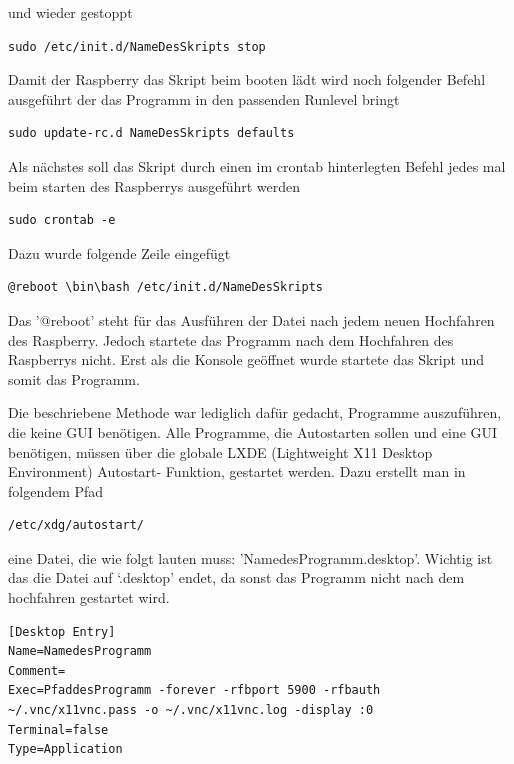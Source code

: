 \documentclass[11pt,a4paper]{article} %
\begin{document}
und wieder gestoppt
\begin{frame}

\begin{lstlisting}
sudo /etc/init.d/NameDesSkripts stop
\end{lstlisting}
\end{frame}

Damit der Raspberry das Skript beim booten lädt wird noch folgender Befehl ausgeführt der das Programm in den passenden Runlevel bringt
\begin{frame}

\begin{lstlisting}
sudo update-rc.d NameDesSkripts defaults
\end{lstlisting}
\end{frame}
\par

Als nächstes soll das Skript durch einen im crontab hinterlegten Befehl jedes mal beim starten des Raspberrys ausgeführt werden
\begin{frame}

\begin{lstlisting}
sudo crontab -e
\end{lstlisting}
\end{frame}
\newpage
Dazu wurde folgende Zeile eingefügt
\begin{frame}

\begin{lstlisting}
@reboot \bin\bash /etc/init.d/NameDesSkripts
\end{lstlisting}
\end{frame}
Das '@reboot' steht für das Ausführen der Datei nach jedem neuen Hochfahren des Raspberry. Jedoch startete das Programm nach dem Hochfahren des Raspberrys nicht. Erst als die Konsole geöffnet wurde startete das Skript und somit das Programm.
\par
Die beschriebene Methode war lediglich dafür gedacht, Programme auszuführen, die keine GUI benötigen. Alle Programme, die Autostarten sollen und eine GUI benötigen, müssen über die globale LXDE (Lightweight X11 Desktop Environment) Autostart- Funktion, gestartet werden. \cite{12}
Dazu erstellt man in folgendem Pfad
\begin{frame}

\begin{lstlisting}
/etc/xdg/autostart/
\end{lstlisting}
\end{frame}
eine Datei, die wie folgt lauten muss: 'NamedesProgramm.desktop'. Wichtig ist das die Datei auf `.desktop' endet, da sonst das Programm nicht nach dem hochfahren gestartet wird.
\begin{frame}

\begin{lstlisting}
[Desktop Entry]
Name=NamedesProgramm
Comment=
Exec=PfaddesProgramm -forever -rfbport 5900 -rfbauth ~/.vnc/x11vnc.pass -o ~/.vnc/x11vnc.log -display :0
Terminal=false
Type=Application
\end{lstlisting}
\end{frame}
\end{document}
